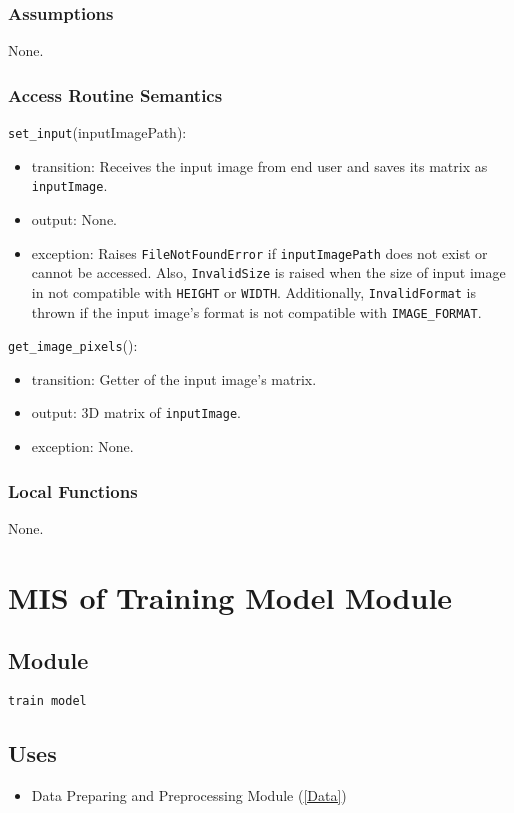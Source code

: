 \documentclass[12pt, titlepage]{article}
\def\code#1{\texttt{#1}}
\begin{document}
\subsubsection{Assumptions}
None.

\subsubsection{Access Routine Semantics}

\noindent \code{set\_input}(inputImagePath):
\begin{itemize}
  \item transition: Receives the input image from end user and saves its matrix as \code{inputImage}.
  \item output: None.
  \item exception: Raises \code{FileNotFoundError} if \code{inputImagePath} does not exist or cannot be accessed. 
  Also, \code{InvalidSize} is raised when the size of input image in not compatible with \code{HEIGHT} or 
  \code{WIDTH}. Additionally, \code{InvalidFormat} is thrown if the input image's format is 
  not compatible with \code{IMAGE\_FORMAT}.
\end{itemize}

\noindent \code{get\_image\_pixels}():
\begin{itemize}
  \item transition: Getter of the input image's matrix.
  \item output: 3D matrix of \code{inputImage}.
  \item exception: None.
\end{itemize}


\subsubsection{Local Functions}
None.

\section{MIS of Training Model Module} \label{Train-Model} 

\subsection{Module}
\code{train model} 

\subsection{Uses}
\begin{itemize}
  \item Data Preparing and Preprocessing Module (\ref{Data})
\end{itemize}
\end{document}

